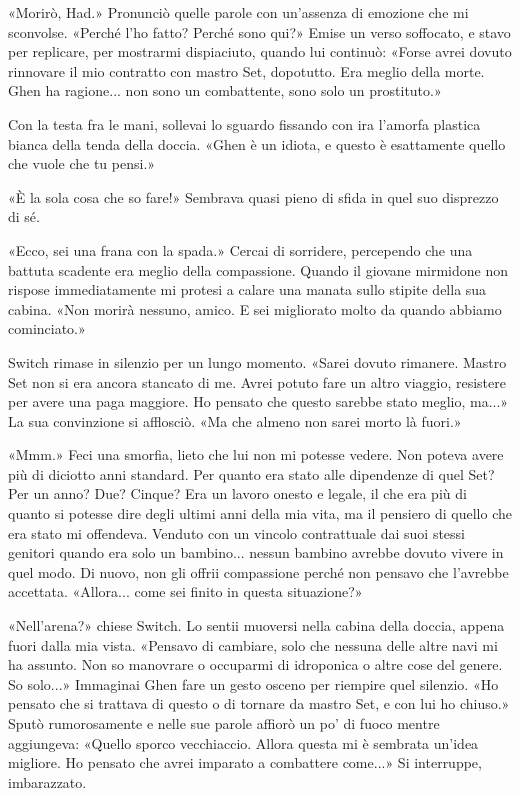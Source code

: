 «Morirò, Had.» Pronunciò quelle parole con un'assenza di emozione che mi
sconvolse. «Perché l'ho fatto? Perché sono qui?» Emise un verso
soffocato, e stavo per replicare, per mostrarmi dispiaciuto, quando lui
continuò: «Forse avrei dovuto rinnovare il mio contratto con mastro Set,
dopotutto. Era meglio della morte. Ghen ha ragione... non sono un
combattente, sono solo un prostituto.»

Con la testa fra le mani, sollevai lo sguardo fissando con ira l'amorfa
plastica bianca della tenda della doccia. «Ghen è un idiota, e questo è
esattamente quello che vuole che tu pensi.»

«È la sola cosa che so fare!» Sembrava quasi pieno di sfida in quel suo
disprezzo di sé.

«Ecco, sei una frana con la spada.» Cercai di sorridere, percependo che
una battuta scadente era meglio della compassione. Quando il giovane
mirmidone non rispose immediatamente mi protesi a calare una manata
sullo stipite della sua cabina. «Non morirà nessuno, amico. E sei
migliorato molto da quando abbiamo cominciato.»

Switch rimase in silenzio per un lungo momento. «Sarei dovuto rimanere.
Mastro Set non si era ancora stancato di me. Avrei potuto fare un altro
viaggio, resistere per avere una paga maggiore. Ho pensato che questo
sarebbe stato meglio, ma...» La sua convinzione si afflosciò. «Ma che
almeno non sarei morto là fuori.»

«Mmm.» Feci una smorfia, lieto che lui non mi potesse vedere. Non poteva
avere più di diciotto anni standard. Per quanto era stato alle
dipendenze di quel Set? Per un anno? Due? Cinque? Era un lavoro onesto e
legale, il che era più di quanto si potesse dire degli ultimi anni della
mia vita, ma il pensiero di quello che era stato mi offendeva. Venduto
con un vincolo contrattuale dai suoi stessi genitori quando era solo un
bambino... nessun bambino avrebbe dovuto vivere in quel modo. Di nuovo,
non gli offrii compassione perché non pensavo che l'avrebbe accettata.
«Allora... come sei finito in questa situazione?»

«Nell'arena?» chiese Switch. Lo sentii muoversi nella cabina della
doccia, appena fuori dalla mia vista. «Pensavo di cambiare, solo che
nessuna delle altre navi mi ha assunto. Non so manovrare o occuparmi di
idroponica o altre cose del genere. So solo...» Immaginai Ghen fare un
gesto osceno per riempire quel silenzio. «Ho pensato che si trattava di
questo o di tornare da mastro Set, e con lui ho chiuso.» Sputò
rumorosamente e nelle sue parole affiorò un po' di fuoco mentre
aggiungeva: «Quello sporco vecchiaccio. Allora questa mi è sembrata
un'idea migliore. Ho pensato che avrei imparato a combattere come...» Si
interruppe, imbarazzato.

